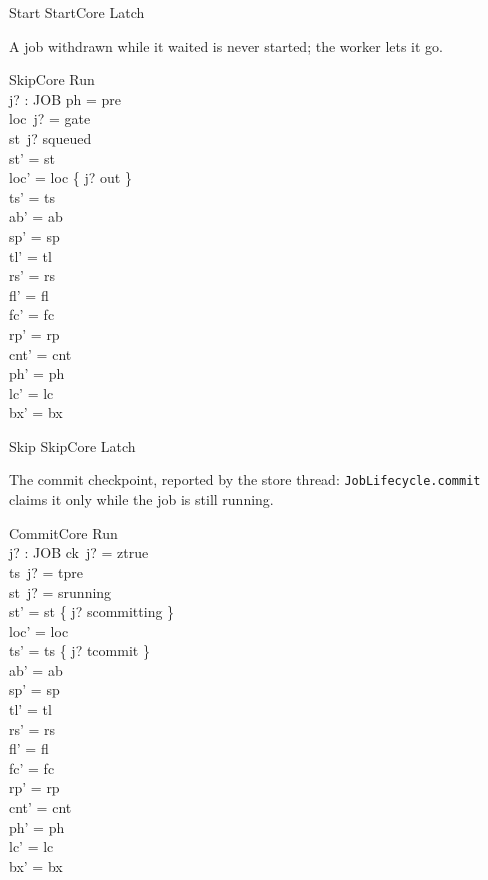 \documentclass[a4paper,10pt,fleqn]{article}
\newcommand{\field}[1]{\texttt{#1}}
\begin{document}
\begin{zed}
Start  StartCore \land Latch
\end{zed}

A job withdrawn while it waited is never started; the worker lets it go.

\begin{schema}{SkipCore}
\Delta Run \\ j? : JOB
\where
ph = pre \\
loc~j? = gate \\
st~j? \neq squeued \\
st' = st \\
loc' = loc \oplus \{ j? \mapsto out \} \\
ts' = ts \\
ab' = ab \\
sp' = sp \\
tl' = tl \\
rs' = rs \\
fl' = fl \\
fc' = fc \\
rp' = rp \\
cnt' = cnt \\
ph' = ph \\
lc' = lc \\
bx' = bx
\end{schema}

\begin{zed}
Skip  SkipCore \land Latch
\end{zed}

The commit checkpoint, reported by the store thread: \field{JobLifecycle.commit}
claims it only while the job is still running.

\begin{schema}{CommitCore}
\Delta Run \\ j? : JOB
\where
ck~j? = ztrue \\
ts~j? = tpre \\
st~j? = srunning \\
st' = st \oplus \{ j? \mapsto scommitting \} \\
loc' = loc \\
ts' = ts \oplus \{ j? \mapsto tcommit \} \\
ab' = ab \\
sp' = sp \\
tl' = tl \\
rs' = rs \\
fl' = fl \\
fc' = fc \\
rp' = rp \\
cnt' = cnt \\
ph' = ph \\
lc' = lc \\
bx' = bx
\end{schema}
\end{document}
